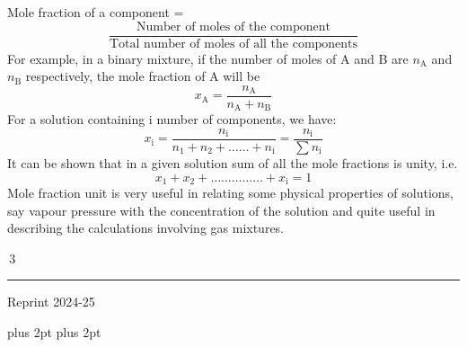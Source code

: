 \documentclass[11pt,a4paper]{article}
\renewcommand{\normalsize}{\fontsize{10.5bp}{12.7bp}\selectfont\abovedisplayskip=4pt plus 2pt\belowdisplayskip=4pt plus 2pt\abovedisplayshortskip=2pt\belowdisplayshortskip=2pt}
\begin{document}
\begin{minipage}[t]{0.77\textwidth}
\begin{enumerate}[label=(\roman*),leftmargin=24pt,itemsep=3pt,topsep=0pt,start=3]
Mole fraction of a component =
\[ \frac{\text{Number of moles of the component}}{\text{Total number of moles of all the components}} \tag{1.4} \]
For example, in a binary mixture, if the number of moles of A and B are $n_\text{A}$ and $n_\text{B}$ respectively, the mole fraction of A will be
\[ x_\text{A} = \frac{n_\text{A}}{n_\text{A} + n_\text{B}} \tag{1.5} \]
For a solution containing i number of components, we have:
\[ x_\text{i} = \frac{n_\text{i}}{n_1 + n_2 + \ldots\ldots + n_\text{i}} = \frac{n_\text{i}}{\sum n_\text{i}} \tag{1.6} \]
It can be shown that in a given solution sum of all the mole fractions is unity, i.e.
\[ x_1 + x_2 + \ldots\ldots\ldots\ldots\ldots + x_\text{i} = 1 \tag{1.7} \]
Mole fraction unit is very useful in relating some physical properties of solutions, say vapour pressure with the concentration of the solution and quite useful in describing the calculations involving gas mixtures.
\end{enumerate}
\end{minipage}

\vfill
\noindent\hfill\begin{minipage}{0.33\textwidth}
\colorbox{Goldenrod1}{\color{gray}\,3\,}\\[-6pt]
{\color{Goldenrod1}\rule{\linewidth}{1pt}}
\end{minipage}
\begin{center}
{\sffamily\small Reprint 2024-25}
\end{center}

\normalsize

\end{document}
